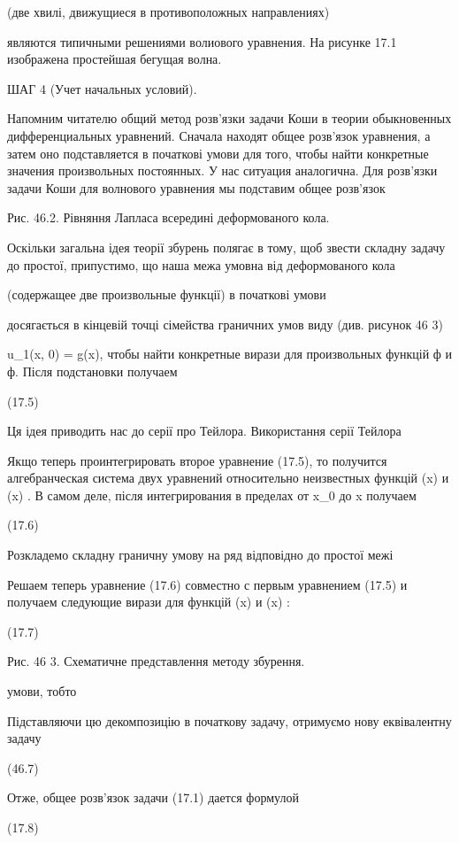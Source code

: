 \documentclass[
  ukrainian,
]{article}
\begin{document}
(две хвилі, движущиеся в противоположных направлениях)

являются типичными решениями волиового уравнения. На рисунке 17.1
изображена простейшая бегущая волна.

ШАГ 4 (Учет начальных условий).

Напомним читателю общий метод розв'язки задачи Коши в теории
обыкновенных дифференциальных уравнений. Сначала находят общее розв'язок
уравнения, а затем оно подставляется в початкові умови для того, чтобы
найти конкретные значения произвольных постоянных. У нас ситуация
аналогична. Для розв'язки задачи Коши для волнового уравнения мы
подставим общее розв'язок

Рис. 46.2. Рівняння Лапласа всередині деформованого кола.

Оскільки загальна ідея теорії збурень полягає в тому, щоб звести складну
задачу до простої, припустимо, що наша межа умовна від деформованого
кола

(содержащее две произвольные функції) в початкові умови

досягається в кінцевій точці сімейства граничних умов виду (див. рисунок
46 3)

u\_1(x, 0) = g(x), чтобы найти конкретные вирази для произвольных
функцій ф и ф. Після подстановки получаем

(17.5)

Ця ідея приводить нас до серії про Тейлора. Використання серії Тейлора

Якщо теперь проинтегрировать второе уравнение (17.5), то получится
алгебранческая система двух уравнений относительно неизвестных функцій
\varphi(x) и \psi(x) . В самом деле, після интегрирования в пределах от
x\_0 до x получаем

(17.6)

Розкладемо складну граничну умову на ряд відповідно до простої межі

Решаем теперь уравнение (17.6) совместно с первым уравнением (17.5) и
получаем следующие вирази для функцій \varphi(x) и \psi(x) :

(17.7)

Рис. 46 3. Схематичне представлення методу збурення.

умови, тобто

Підставляючи цю декомпозицію в початкову задачу, отримуємо нову
еквівалентну задачу

(46.7)

Отже, общее розв'язок задачи (17.1) дается формулой

(17.8)
\end{document}
